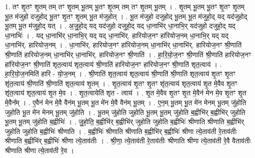 \documentclass[17pt]{extarticle}
\begin{document}
1. तꣳ शृ॒तꣳ शृ॒तम् तम् तꣳ शृ॒तम् भू॒तम् भू॒तꣳ शृ॒तम् तम् तꣳ शृ॒तम् भू॒तम् । . शृ॒तम् भू॒तम् भू॒तꣳ शृ॒तꣳ शृ॒तम् भू॒त म॑जुहो दजुहोद् भू॒तꣳ शृ॒तꣳ शृ॒तम् भू॒त म॑जुहोत् । . भू॒त म॑जुहो दजुहोद् भू॒तम् भू॒त म॑जुहो॒द् यद् यद॑जुहोद् भू॒तम् भू॒त म॑जुहो॒द् यत् । . अ॒जु॒हो॒द् यद् यद॑जुहो दजुहो॒द् यद् धा॒नाभि॑र् धा॒नाभि॒र् यद॑जुहो दजुहो॒द् यद् धा॒नाभिः॑ । . यद् धा॒नाभि॑र् धा॒नाभि॒र् यद् यद् धा॒नाभि॑र्. हारियोज॒नꣳ हा॑रियोज॒नम् धा॒नाभि॒र् यद् यद् धा॒नाभि॑र्. हारियोज॒नम् । . धा॒नाभि॑र्. हारियोज॒नꣳ हा॑रियोज॒नम् धा॒नाभि॑र् धा॒नाभि॑र्. हारियोज॒नꣳ श्री॒णाति॑ श्री॒णाति॑ हारियोज॒नम् धा॒नाभि॑र् धा॒नाभि॑र्. हारियोज॒नꣳ श्री॒णाति॑ । . हा॒रि॒यो॒ज॒नꣳ श्री॒णाति॑ श्री॒णाति॑ हारियोज॒नꣳ हा॑रियोज॒नꣳ श्री॒णाति॑ शृत॒त्वाय॑ शृत॒त्वाय॑ श्री॒णाति॑ हारियोज॒नꣳ हा॑रियोज॒नꣳ श्री॒णाति॑ शृत॒त्वाय॑ । . हा॒रि॒यो॒ज॒नमिति॑ हारि - यो॒ज॒नम् । . श्री॒णाति॑ शृत॒त्वाय॑ शृत॒त्वाय॑ श्री॒णाति॑ श्री॒णाति॑ शृत॒त्वाय॑ शृ॒तꣳ शृ॒तꣳ शृ॑त॒त्वाय॑ श्री॒णाति॑ श्री॒णाति॑ शृत॒त्वाय॑ शृ॒तम् । . शृ॒त॒त्वाय॑ शृ॒तꣳ शृ॒तꣳ शृ॑त॒त्वाय॑ शृत॒त्वाय॑ शृ॒त मे॒वैव शृ॒तꣳ शृ॑त॒त्वाय॑ शृत॒त्वाय॑ शृ॒त मे॒व । . शृ॒त॒त्वायेति॑ शृत - त्वाय॑ । . शृ॒त मे॒वैव शृ॒तꣳ शृ॒त मे॒वैन॑ मेन मे॒व शृ॒तꣳ शृ॒त मे॒वैन᳚म् । . ए॒वैन॑ मेन मे॒वै वैन॑म् भू॒तम् भू॒त मे॑न मे॒वै वैन॑म् भू॒तम् । . ए॒न॒म् भू॒तम् भू॒त मे॑न मेनम् भू॒तम् जु॑होति जुहोति भू॒त मे॑न मेनम् भू॒तम् जु॑होति । . भू॒तम् जु॑होति जुहोति भू॒तम् भू॒तम् जु॑होति ब॒ह्वीभि॑र् ब॒ह्वीभि॑र् जुहोति भू॒तम् भू॒तम् जु॑होति ब॒ह्वीभिः॑ । . जु॒हो॒ति॒ ब॒ह्वीभि॑र् ब॒ह्वीभि॑र् जुहोति जुहोति ब॒ह्वीभिः॑ श्रीणाति श्रीणाति ब॒ह्वीभि॑र् जुहोति जुहोति ब॒ह्वीभिः॑ श्रीणाति । . ब॒ह्वीभिः॑ श्रीणाति श्रीणाति ब॒ह्वीभि॑र् ब॒ह्वीभिः॑ श्रीणा त्ये॒ताव॑ती रे॒ताव॑तीः श्रीणाति ब॒ह्वीभि॑र् ब॒ह्वीभिः॑ श्रीणा त्ये॒ताव॑तीः । . श्री॒णा॒ त्ये॒ताव॑ती रे॒ताव॑तीः श्रीणाति श्रीणा त्ये॒ताव॑ती रे॒वै वैताव॑तीः श्रीणाति श्रीणा त्ये॒ताव॑ती रे॒व । \newline
\end{document}
